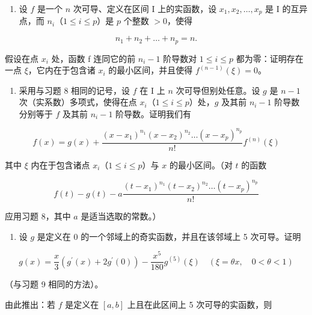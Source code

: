 \begin{enumerate}
\def\labelenumi{\arabic{enumi})}
\setcounter{enumi}{7}
\tightlist
\item
  设 \(f\) 是一个 \(n\) 次可导、定义在区间 \(\mathrm{I}\) 上的实函数，设 \(x_{1}, x_{2}, \ldots, x_{p}\) 是 \(\mathrm{I}\) 的互异点，而 \(n_{i}\)（\(1 \leqslant i \leqslant p\)）是 \(p\) 个整数 \(> 0\)，使得
\end{enumerate}

\[
n _ {1} + n _ {2} + \dots + n _ {p} = n.
\]

假设在点 \(x_{i}\) 处，函数 f 连同它的前 \(n_{i}-1\) 阶导数对 \(1 \leqslant i \leqslant p\) 都为零：证明存在一点 \(\xi\)，它内在于包含诸 \(x_{i}\) 的最小区间，并且使得 \(f^{(n-1)}(\xi) = 0\)。

\begin{enumerate}
\def\labelenumi{\arabic{enumi})}
\setcounter{enumi}{8}
\tightlist
\item
  采用与习题 8 相同的记号，设 \(f\) 在 I 上 \(n\) 次可导但别处任意。设 \(g\) 是 \(n - 1\) 次（实系数）多项式，使得在点 \(x_{i}\)（\(1 \leqslant i \leqslant p\)）处，\(g\) 及其前 \(n_{i} - 1\) 阶导数分别等于 \(f\) 及其前 \(n_{i} - 1\) 阶导数。证明我们有
\end{enumerate}

\[
f (x) = g (x) + \frac {(x - x _ {1}) ^ {n _ {1}} (x - x _ {2}) ^ {n _ {2}} \dots (x - x _ {p}) ^ {n _ {p}}}{n !} f ^ {(n)} (\xi)
\]

其中 \(\xi\) 内在于包含诸点 \(x_{i}\)（\(1 \leqslant i \leqslant p\)）与 \(x\) 的最小区间。（对 \(t\) 的函数

\[
f (t) - g (t) - a \frac {(t - x _ {1}) ^ {n _ {1}} (t - x _ {2}) ^ {n _ {2}} \dots (t - x _ {p}) ^ {n _ {p}}}{n !}
\]

应用习题 8，其中 \(a\) 是适当选取的常数。）

\begin{enumerate}
\def\labelenumi{\arabic{enumi})}
\setcounter{enumi}{9}
\tightlist
\item
  设 \(g\) 是定义在 0 的一个邻域上的奇实函数，并且在该邻域上 5 次可导。证明
\end{enumerate}

\[
g (x) = \frac {x}{3} \left(g ^ {\prime} (x) + 2 g ^ {\prime} (0)\right) - \frac {x ^ {5}}{1 8 0} g ^ {(5)} (\xi) \quad (\xi = \theta x, \quad 0 <   \theta <   1)
\]

（与习题 9 相同的方法）。

由此推出：若 \(f\) 是定义在 \([a, b]\) 上且在此区间上 5 次可导的实函数，则

